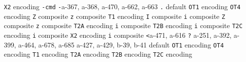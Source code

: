 \documentclass[twoside]{ltxdoc}
\makeatletter
\renewenvironment{theindex}{%
   \@restonecoltrue
   \if@twocolumn\@restonecolfalse\fi
   \columnseprule \z@
   \columnsep 35\p@
   \twocolumn[\index@prologue]%
   \IndexParms
   \let\item\@idxitem
   \ignorespaces
}{\if@restonecol\onecolumn\else\clearpage\fi}
\makeatother
\begin{document}
\begin{theindex}
    \subitem \texttt  {X2} encoding\pfill {}
  \item \texttt  {\MetaNormalfont {}-cmd}\pfill 
  \item \texttt  {\MetaNormalfont {}}\pfill 
  \item \texttt  {-}\pfill a-367, a-368, a-470, 
                a-662, a-663
  \item \texttt  {.}\efill 
    \subitem default\pfill {}
    \subitem \texttt  {OT1} encoding\pfill {}
    \subitem \texttt  {OT4} encoding\pfill {}
      \subsubitem \texttt  {Z} composite\pfill {}
      \subsubitem \texttt  {z} composite\pfill {}
    \subitem \texttt  {T1} encoding\pfill {}
      \subsubitem \texttt  {I} composite\pfill {}
      \subsubitem \texttt  {i} composite\pfill {}
      \subsubitem \texttt  {Z} composite\pfill {}
      \subsubitem \texttt  {z} composite\pfill {}
    \subitem \texttt  {T2A} encoding\pfill {}
      \subsubitem \texttt  {i} composite\pfill {}
    \subitem \texttt  {T2B} encoding\pfill {}
      \subsubitem \texttt  {i} composite\pfill {}
    \subitem \texttt  {T2C} encoding\pfill {}
      \subsubitem \texttt  {i} composite\pfill {}
    \subitem \texttt  {X2} encoding\pfill {}
      \subsubitem \texttt  {i} composite\pfill {}
  \item \texttt  {<}\pfill a-471, a-616
  \item \texttt  {\MetaNormalfont {}?}\pfill 
  \item \texttt  {}\pfill a-251, a-392, 
                a-399, a-464, a-678, a-685
  \item \texttt  {}\pfill a-427, a-429, 
                b-39, b-41
  \item \texttt  {}\efill 
    \subitem default\pfill {}
    \subitem \texttt  {OT1} encoding\pfill {}
    \subitem \texttt  {OT4} encoding\pfill {}
    \subitem \texttt  {T1} encoding\pfill {}
    \subitem \texttt  {T2A} encoding\pfill {}
    \subitem \texttt  {T2B} encoding\pfill {}
    \subitem \texttt  {T2C} encoding\pfill {}

\end{theindex}
\end{document}
